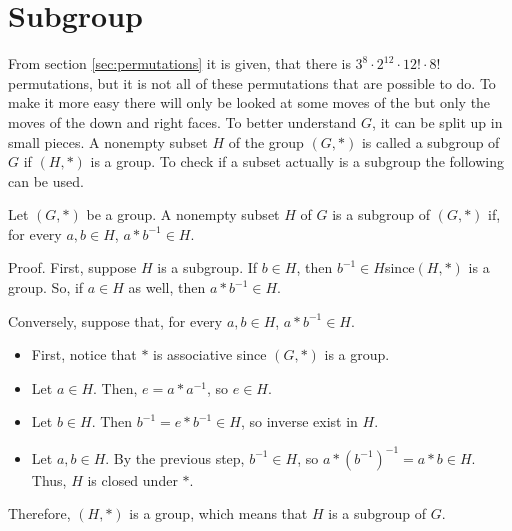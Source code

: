 \section{Subgroup}
From section \ref{sec:permutations} it is given, that there is $3^8\cdot2^{12}\cdot12!\cdot8!$ permutations, but it is not all of these permutations that are possible to do. To make it more easy there will only be looked at some moves of the \rubik{} but only the moves of the down and right faces. To better understand $G$, it can be split up in small pieces.
A nonempty subset $H$ of the group $(G,*)$ is called a subgroup of $G$ if $(H,*)$ is a group.
To check if a subset actually is a subgroup the following can be used.


Let $(G,*)$ be a group. A nonempty subset $H$ of $G$ is a subgroup of $(G,*)$ if, for every $a, b \in H$, $a * b^{-1} \in H$.

Proof. First, suppose $H$ is a subgroup. If $b \in H$, then $b^{-1} \in H $since$ (H,*)$ is a group. So, if $a \in H$ as well, then $a * b^{-1} \in H$.

Conversely, suppose that, for every $a, b \in H$, $a * b^{-1} \in H$.

\begin {itemize}
\item First, notice that $*$ is associative since $(G,*)$ is a group.
\item Let $a \in H$. Then, $e = a * a^{-1}$, so $e \in H$.
\item Let $b \in H$. Then $b^{-1} = e * b^{-1} \in H$, so inverse exist in $H$.
\item Let $a, b \in H$. By the previous step, $b^{-1} \in H$, so $a* (b^{-1})^{-1} = a* b \in H$. Thus, $H$ is closed under $*$.
\end {itemize}

Therefore, $(H,*)$ is a group, which means that $H$ is a subgroup of $G$.
